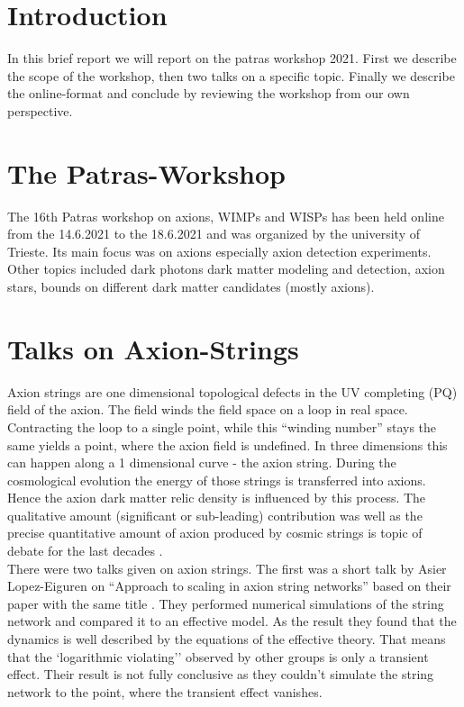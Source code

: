 \documentclass[a4paper]{article}
\begin{document}
\section{Introduction}
In this brief report we will report on the patras workshop 2021.
First we describe the scope of the workshop, then two talks on a specific topic.
Finally we describe the online-format and conclude by reviewing the workshop from our own perspective.

\section{The Patras-Workshop}
The 16th Patras workshop on axions, WIMPs and WISPs has been held online from the 14.6.2021 to the 18.6.2021 and was organized by the university of Trieste.
Its main focus was on axions especially axion detection experiments.
Other topics included dark photons dark matter modeling and
detection,  axion stars,  bounds on different dark matter candidates (mostly axions).

\section{Talks on Axion-Strings}
Axion strings are one dimensional topological defects in the UV completing
(PQ) field of the axion. The field winds the field space on a loop
in real space. Contracting the loop to a single point, while this ``winding number'' stays the same yields a point, where the axion field is undefined. In three dimensions this can happen along a 1 dimensional curve - the axion string.
During the cosmological evolution the energy of those strings is transferred into axions.
Hence the axion dark matter relic density is influenced by this process.
The qualitative amount (significant or sub-leading) contribution was well as the precise quantitative amount
of axion produced by cosmic strings is topic of debate for the last decades \cite{Gorghetto_2018}. \\


\noindent
There were two talks given on axion strings.
The first was a short talk by Asier Lopez-Eiguren on ``Approach to scaling in axion string networks'' based on their paper with the same title \cite{Hindmarsh_2021}.
They performed numerical simulations of the string network and compared it to an effective
model. As the result they found that the dynamics is well described by the equations of the effective theory. That means that the `logarithmic violating'' observed by other groups is only a transient effect.
Their result is not fully conclusive as they couldn't simulate the string network to the point, where
the transient effect vanishes. \\
\end{document}
